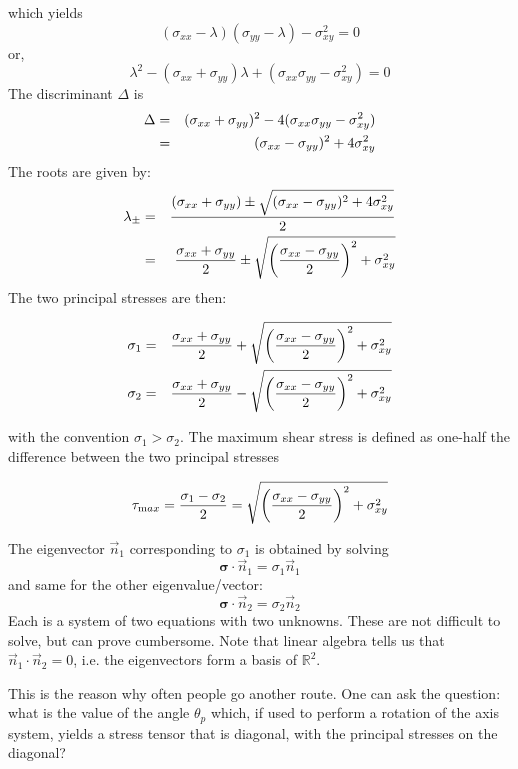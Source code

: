 which yields
\[
(\sigma_{xx}-\lambda)(\sigma_{yy}-\lambda)-\sigma_{xy}^2 =0
\]
or, 
\[
\lambda^2 - (\sigma_{xx}+\sigma_{yy}) \lambda   + (\sigma_{xx}\sigma_{yy}-\sigma_{xy}^2) =0
\]
The discriminant $\Delta$ is 
\begin{eqnarray}
\Delta 
&=& (\sigma_{xx}+\sigma_{yy})^2-4(\sigma_{xx}\sigma_{yy}-\sigma_{xy}^2)  \nonumber\\
&=& (\sigma_{xx}-\sigma_{yy})^2 +4\sigma_{xy}^2  \nonumber
\end{eqnarray}
The roots are given by:
\begin{eqnarray}
\lambda_\pm 
&=& \frac{ (\sigma_{xx}+\sigma_{yy}) \pm \sqrt{ (\sigma_{xx}-\sigma_{yy})^2 +4\sigma_{xy}^2 } }{2} \nonumber\\
&=& \frac{ \sigma_{xx}+\sigma_{yy}}{2} \pm \sqrt{ \left(\frac{\sigma_{xx}-\sigma_{yy}}{2}\right)^2 +\sigma_{xy}^2 } \nonumber
\end{eqnarray}
The two principal stresses are then:
\begin{mdframed}[backgroundcolor=blue!5]
\begin{eqnarray}
\sigma_1 &=& \frac{ \sigma_{xx}+\sigma_{yy}}{2} + \sqrt{ \left(\frac{\sigma_{xx}-\sigma_{yy}}{2}\right)^2 +\sigma_{xy}^2 } \nonumber\\
\sigma_2 &=& \frac{ \sigma_{xx}+\sigma_{yy}}{2} - \sqrt{ \left(\frac{\sigma_{xx}-\sigma_{yy}}{2}\right)^2 +\sigma_{xy}^2 } \label{eq:princ_stress_2D} 
\end{eqnarray}
\end{mdframed}
with the convention $\sigma_1>\sigma_2$.
The maximum shear stress is defined as one-half the difference between the two principal 
stresses 
\begin{mdframed}[backgroundcolor=blue!5]
\begin{equation}
\tau_{\text max}=
\frac{\sigma_1-\sigma_2}{2}
=\sqrt{ \left(\frac{\sigma_{xx}-\sigma_{yy}}{2}\right)^2 +\sigma_{xy}^2 }
\label{eq:max_shear_stress_2D} 
\end{equation}
\end{mdframed}
The eigenvector $\vec{n}_1$ corresponding to $\sigma_1$ is obtained by solving 
\[
{\bm \sigma}\cdot \vec{n}_1 = \sigma_1 \vec{n}_1
\]
and same for the other eigenvalue/vector:
\[
{\bm \sigma}\cdot \vec{n}_2 = \sigma_2 \vec{n}_2
\]
Each is a system of two equations with two unknowns. These are not difficult to solve, 
but can prove cumbersome. Note that linear algebra tells us that $\vec{n}_1\cdot\vec{n}_2=0$, 
i.e. the eigenvectors form a basis of $\mathbb{R}^2$.

This is the reason why often people go another route. One can ask the question: what is the 
value of the angle $\theta_p$ which, if used to perform a rotation of the axis system, yields 
a stress tensor that is diagonal, with the principal stresses on the diagonal?
 
